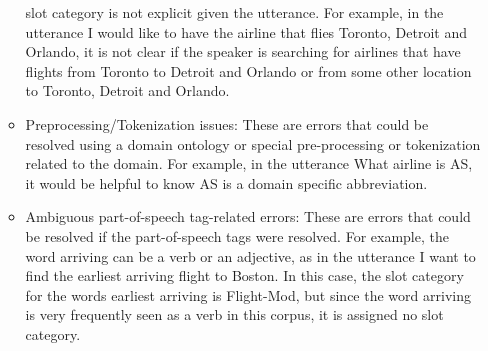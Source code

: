 \begin{enumerate}
\begin{itemize}
slot category is not explicit given the utterance. For
example, in the utterance I would like to have the airline
that flies Toronto, Detroit and Orlando, it is not
clear if the speaker is searching for airlines that have
flights from Toronto to Detroit and Orlando or from
some other location to Toronto, Detroit and Orlando.
\item Preprocessing/Tokenization issues: These are errors that
could be resolved using a domain ontology or special
pre-processing or tokenization related to the domain.
For example, in the utterance What airline is AS, it
would be helpful to know AS is a domain specific abbreviation.
\item Ambiguous part-of-speech tag-related errors: These are
errors that could be resolved if the part-of-speech tags
were resolved. For example, the word arriving can be a
verb or an adjective, as in the utterance I want to find the
earliest arriving flight to Boston. In this case, the slot
category for the words earliest arriving is Flight-Mod,
but since the word arriving is very frequently seen as a
verb in this corpus, it is assigned no slot category.
\end{itemize}
\end{enumerate}